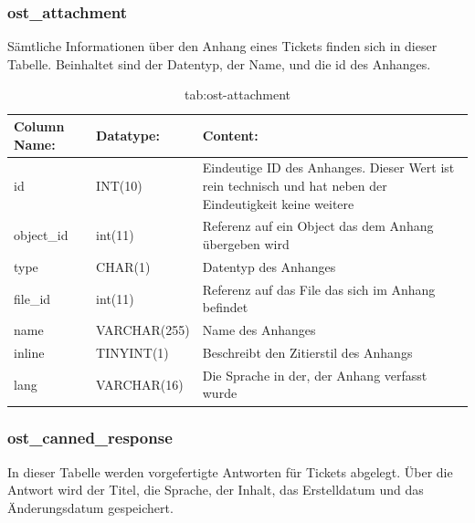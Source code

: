 \subsubsection{ost\_attachment}

Sämtliche Informationen über den Anhang eines Tickets finden sich in dieser Tabelle. Beinhaltet sind der Datentyp, der Name, und die id des Anhanges. 

\begin{table}[h]
	\begin{tabular}{|p{3.5cm}|p{4cm}|p{6.2cm}|}
		\hline
		\textbf{Column Name:} & \textbf{Datatype:} & \textbf{Content:} \\
		\hline
		id & INT(10) & Eindeutige ID des Anhanges. Dieser Wert ist rein technisch und hat  neben der Eindeutigkeit keine weitere  \\
		\hline
		object\_id & int(11) & Referenz auf ein Object das dem Anhang übergeben wird \\
		\hline
		type & CHAR(1) & Datentyp des Anhanges \\
		\hline
		file\_id & int(11) & Referenz auf das File das sich im Anhang befindet\\
		\hline
		name & VARCHAR(255) & Name des Anhanges \\
		\hline
		inline & TINYINT(1) & Beschreibt den Zitierstil des Anhangs \\
		\hline
		lang & VARCHAR(16) & Die Sprache in der, der Anhang verfasst wurde \\
		\hline
	\end{tabular}
	\caption{tab:ost-attachment}
\end{table}
\label{tab:ost_attachment}

\newpage

\subsubsection{ost\_canned\_response}

In dieser Tabelle werden vorgefertigte Antworten für Tickets abgelegt. Über die Antwort wird der Titel, die Sprache, der Inhalt, das Erstelldatum und das Änderungsdatum gespeichert.

